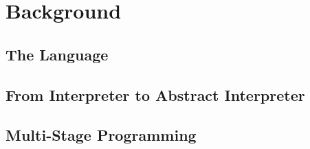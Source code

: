 \section{Background}

\subsection{The Language} \label{bg_lang}

\subsection{From Interpreter to Abstract Interpreter}

\subsection{Multi-Stage Programming}
